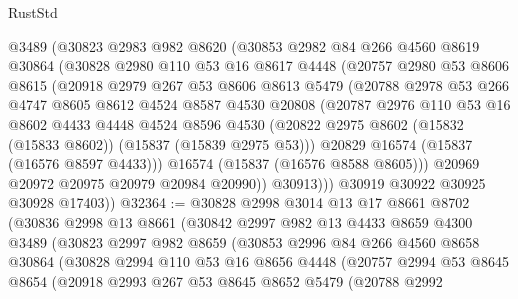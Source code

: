 \begin{lexlean}{RustStd}
\begin{coremodule}
        @3489
        (@30823
          @2983
          @982
          @8620
          (@30853
            @2982
            @84
            @266
            @4560
            @8619
            @30864
            (@30828
              @2980
              @110
              @53
              @16
              @8617
              @4448
              (@20757
                @2980
                @53
                @8606
                @8615
                (@20918
                  @2979
                  @267
                  @53
                  @8606
                  @8613
                  @5479
                  (@20788
                    @2978
                    @53
                    @266
                    @4747
                    @8605
                    @8612
                    @4524
                    @8587
                    @4530
                    @20808
                    (@20787
                      @2976
                      @110
                      @53
                      @16
                      @8602
                      @4433
                      @4448
                      @4524
                      @8596
                      @4530
                      (@20822 @2975 @8602 (@15832 (@15833 @8602)) (@15837 (@15839 @2975 @53)))
                      @20829
                      @16574
                      (@15837 (@16576 @8597 @4433)))
                    @16574
                    (@15837 (@16576 @8588 @8605)))
                  @20969
                  @20972
                  @20975
                  @20979
                  @20984
                  @20990))
              @30913)))
        @30919
        @30922
        @30925
        @30928
        @17403))
@32364 := @30828
    @2998
    @3014
    @13
    @17
    @8661
    @8702
    (@30836
      @2998
      @13
      @8661
      (@30842
        @2997
        @982
        @13
        @4433
        @8659
        @4300
        @3489
        (@30823
          @2997
          @982
          @8659
          (@30853
            @2996
            @84
            @266
            @4560
            @8658
            @30864
            (@30828
              @2994
              @110
              @53
              @16
              @8656
              @4448
              (@20757
                @2994
                @53
                @8645
                @8654
                (@20918
                  @2993
                  @267
                  @53
                  @8645
                  @8652
                  @5479
                  (@20788
                    @2992

\end{coremodule}
\end{lexlean}
